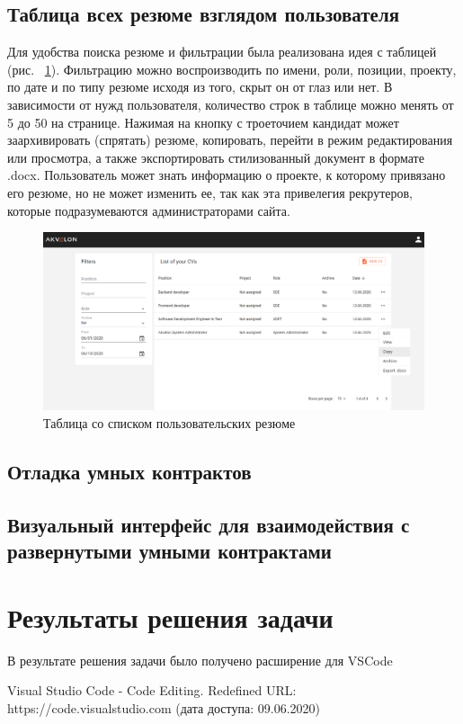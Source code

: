 \documentclass[a4paper,12pt]{diplom}
\begin{document}
\section{Таблица всех резюме взглядом пользователя}

Для удобства поиска резюме и фильтрации была реализована идея с таблицей (рис. ~\ref{15}). Фильтрацию можно воспроизводить по имени, роли, позиции,
проекту, по дате и по типу резюме исходя из того, скрыт он от глаз или нет. В зависимости от нужд пользователя, количество строк в таблице можно менять от 5 до 50 на странице.
Нажимая на кнопку с троеточием кандидат может заархивировать (спрятать) резюме, копировать, перейти в режим редактирования или просмотра, а также экспортировать
стилизованный документ в формате .docx. Пользователь может знать информацию о проекте, к которому привязано его резюме, но не может изменить ее, так как эта привелегия рекрутеров, которые подразумеваются
администраторами сайта.

\begin{figure}[!ht]
	\centering
	\includegraphics[width=1\textwidth]{resources/cvlistuser.png}
	\caption{Таблица со списком пользовательских резюме}
	\label{15}
\end{figure}

\section{Отладка умных контрактов}

\section{Визуальный интерфейс для взаимодействия с развернутыми умными контрактами}

\chapter{Результаты решения задачи}

В результате решения задачи было получено расширение для VSCode


\renewcommand{\bibname}{Список литературы} 
\begin{thebibliography}{9}

Visual Studio Code - Code Editing. Redefined
URL: https://code.visualstudio.com
(дата доступа: 09.06.2020)

\end{thebibliography}
\end{document}
